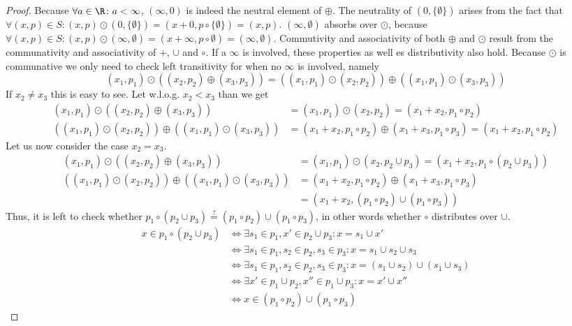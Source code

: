 \begin{proof}
    Because $\forall a \in \R\colon a < \infty$, $(\infty, 0)$ is indeed the neutral element of $\oplus$. The neutrality of $(0, \{\emptyset\})$ arises from the fact that $\forall (x, p) \in S\colon (x, p) \odot (0, \{\emptyset\}) = (x + 0, p \circ \{\emptyset\}) = (x, p)$. $(\infty, \emptyset)$ absorbs over $\odot$, because $\forall (x, p) \in S\colon (x, p) \odot (\infty, \emptyset) = (x + \infty, p \circ \emptyset) = (\infty, \emptyset)$. Commutivity and associativity of both $\oplus$ and $\odot$ result from the communativity and associativity of $+$, $\cup$ and $\circ$. If a $\infty$ is involved, these properties as well es distributivity also hold. Because $\odot$ is communative we only need to check left transitivity for when no $\infty$ is involved, namely 
    $$(x_1, p_1) \odot ((x_2, p_2) \oplus (x_3, p_3)) = ((x_1, p_1) \odot (x_2, p_2)) \oplus ((x_1, p_1) \odot (x_3, p_3))$$
    If $x_2 \neq x_3$ this is easy to see. Let w.l.o.g. $x_2 < x_3$ than we get
    \begin{align*}
        (x_1, p_1) \odot ((x_2, p_2) \oplus (x_3, p_3)) &= (x_1, p_1) \odot (x_2, p_2) = (x_1 + x_2, p_1 \circ p_2)\\
        ((x_1, p_1) \odot (x_2, p_2)) \oplus ((x_1, p_1) \odot (x_3, p_3)) &= (x_1 + x_2, p_1 \circ p_2) \oplus (x_1 + x_3, p_1 \circ p_3) = (x_1 + x_2, p_1 \circ p_2)
    \end{align*}
    Let us now consider the case $x_2 = x_3$.
    \begin{align*}
        (x_1, p_1) \odot ((x_2, p_2) \oplus (x_3, p_3)) &= (x_1, p_1) \odot (x_2, p_2 \cup p_3) = (x_1 + x_2, p_1 \circ (p_2 \cup p_3))\\
        ((x_1, p_1) \odot (x_2, p_2)) \oplus ((x_1, p_1) \odot (x_3, p_3)) &= (x_1 + x_2, p_1 \circ p_2) \oplus (x_1 + x_3, p_1 \circ p_3)\\ 
        &= (x_1 + x_2, (p_1 \circ p_2) \cup (p_1 \circ p_3))
    \end{align*}
    Thus, it is left to check whether $p_1 \circ (p_2 \cup p_3) \stackrel{?}{=} (p_1 \circ p_2) \cup (p_1 \circ p_3)$, in other words whether $\circ$ distributes over $\cup$.
    \begin{align*}
        x \in p_1 \circ (p_2 \cup p_3) &\Leftrightarrow \exists s_1 \in p_1, x' \in p_2 \cup p_3\colon x = s_1 \cup x'\\
        &\Leftrightarrow \exists s_1\in p_1, s_2 \in p_2, s_3 \in p_3 \colon x = s_1 \cup s_2 \cup s_3\\
        &\Leftrightarrow \exists s_1\in p_1, s_2 \in p_2, s_3 \in p_3 \colon x = (s_1 \cup s_2) \cup (s_1 \cup s_3)\\
        &\Leftrightarrow \exists x' \in p_1 \cup p_2, x'' \in p_1 \cup p_3 \colon x = x' \cup x''\\
        &\Leftrightarrow x \in (p_1 \circ p_2) \cup (p_1 \circ p_3)
    \end{align*}


\end{proof}
